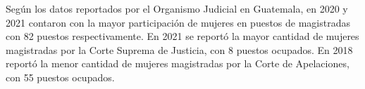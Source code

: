 Según los datos reportados por el Organismo Judicial en Guatemala, en 2020 y 2021 contaron con la mayor participación de mujeres en puestos de magistradas con 82 puestos respectivamente. En 2021 se reportó la mayor cantidad de mujeres magistradas por la Corte Suprema de Justicia, con 8 puestos ocupados. En 2018 reportó la menor cantidad de mujeres magistradas por la Corte de Apelaciones, con 55 puestos ocupados. 